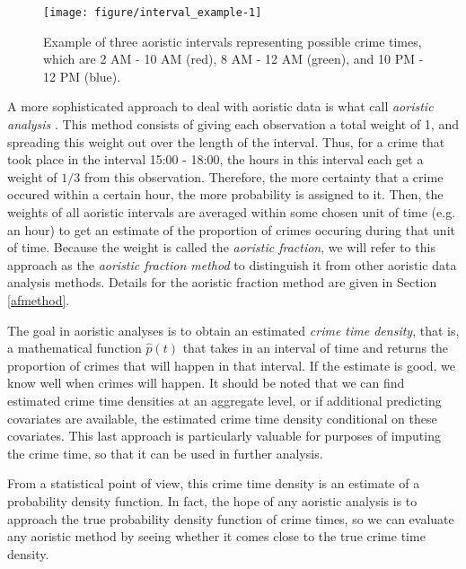 \begin{figure}
\centering
\begin{knitrout}
\color{fgcolor}
\texttt{[image: figure/interval\_example-1]} 

\end{knitrout}
\caption{Example of three aoristic intervals representing possible crime times, which are 2 AM - 10 AM (red), 8 AM - 12 AM (green), and 10 PM - 12 PM (blue). } \label{exdat}
\end{figure}

A more sophisticated approach to deal with aoristic data is what \citet{ashby2013comparison} call \textit{aoristic analysis} \citep{ratcliffe1998aoristic, ratcliffe2000aoristic}. This method consists of giving each observation a total weight of 1, and spreading this weight out over the length of the interval. Thus, for a crime that took place in the interval 15:00 - 18:00, the hours in this interval each get a weight of $1/3$ from this observation. Therefore, the more certainty that a crime occured within a certain hour, the more probability is assigned to it. Then, the weights of all aoristic intervals are averaged within some chosen unit of time (e.g. an hour) to get an estimate of the proportion of crimes occuring during that unit of time. Because the weight is called the \textit{aoristic fraction}, we will refer to this approach as the \textit{aoristic fraction method} to distinguish it from other aoristic data analysis methods. Details for the aoristic fraction method are given in Section \ref{afmethod}.

The goal in  aoristic analyses is to obtain an estimated \textit{crime time density}, that is, a mathematical function $\hat{p}(t)$ that takes in an interval of time and returns the proportion of crimes that will happen in that interval. If the estimate is good, we know well when crimes will happen. It should be noted that we can find estimated crime time densities at an aggregate level, or if additional predicting covariates are available, the estimated crime time density conditional on these covariates. This last approach is particularly valuable for purposes of imputing the crime time, so that it can be used in further analysis.

From a statistical point of view, this crime time density is an estimate of a probability density function. In fact, the hope of any aoristic analysis is to approach the true probability density function of crime times, so we can evaluate any aoristic method by seeing whether it comes close to the true crime time density.



